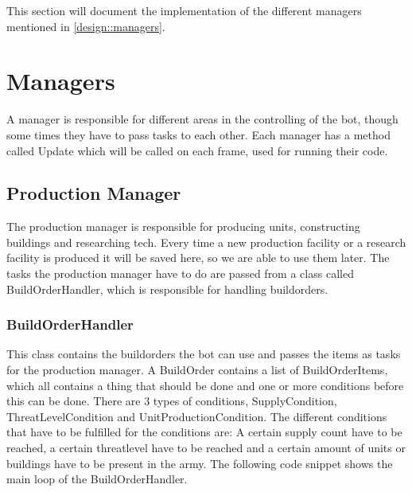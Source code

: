 This section will document the implementation of the different managers mentioned in \ref{design::managers}. 

\section{Managers}
	A manager is responsible for different areas in the controlling of the bot, though some times they have to pass tasks to each other. Each manager has 
	a method called Update which will be called on each frame, used for running their code.
	\subsection{Production Manager}
		The production manager is responsible for producing units, constructing buildings and researching tech. Every time a new production facility or 
		a research facility is produced it will be saved here, so we are able to use them later. 
		The tasks the production manager have to do are passed from a 
		class called BuildOrderHandler, which is responsible for handling buildorders.
		\subsubsection*{BuildOrderHandler}
			This class contains the buildorders the bot can use and passes the items as tasks for the production manager. A BuildOrder contains a list of 
			BuildOrderItems, which all contains a thing that should be done and one or more conditions before this can be done. 
			There are 3 types of conditions, SupplyCondition, ThreatLevelCondition and UnitProductionCondition. The different conditions that have 
			to be fulfilled for the conditions are: A certain supply count have to be reached, a certain threatlevel have to be reached and a certain 
			amount of units or buildings have to be present in the army. The following code snippet shows the main loop of the BuildOrderHandler. 
			
